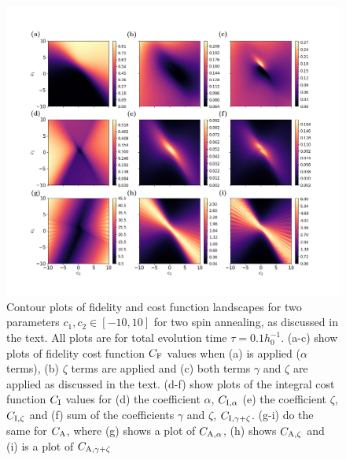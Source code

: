 \begin{figure}[t!]
    \centering
    \includegraphics[width=\linewidth]{images_v1/two_spin_contours.png} \caption[Two-spin annealing contour plots for final state fidelity and AGP cost function values.]{Contour plots of fidelity and  cost function landscapes for two parameters $c_1, c_2 \in [-10, 10]$ for two spin annealing, as discussed in the text. All plots are for total evolution time $\tau = 0.1 h_0^{-1}$. (a-c) show plots of fidelity cost function $C_{\rm F}$ values when (a)   is applied ($\alpha$ terms), (b)   $\zeta$ terms are applied and (c) both   terms $\gamma$ and $\zeta$ are applied as discussed in the text. (d-f) show plots of the integral cost function $C_{\rm I}$ values for (d) the coefficient $\alpha$, $C_{\rm I, \alpha}$ (e) the coefficient $\zeta$, $C_{\rm I, \zeta}$ and (f) sum of the coefficients $\gamma$ and $\zeta$, $C_{\rm I, \gamma + \zeta}$. (g-i) do the same for $C_{\rm A}$, where (g) shows a plot of $C_{\rm A, \alpha}$, (h) shows $C_{\rm A, \zeta}$ and (i) is a plot of $C_{\rm A, \gamma + \zeta}$}\label{fig:two_spin_higher_order}
\end{figure}

